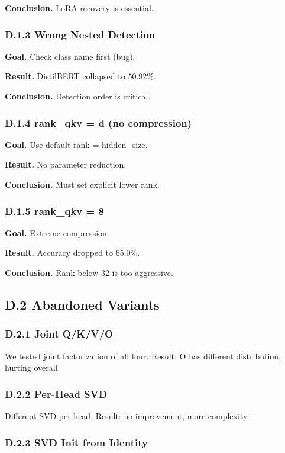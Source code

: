\textbf{Conclusion.} LoRA recovery is essential.

\subsubsection{D.1.3 Wrong Nested Detection}

\textbf{Goal.} Check class name first (bug).

\textbf{Result.} DistilBERT collapsed to 50.92\%.

\textbf{Conclusion.} Detection order is critical.

\subsubsection{D.1.4 rank\_qkv = d (no compression)}

\textbf{Goal.} Use default rank = hidden\_size.

\textbf{Result.} No parameter reduction.

\textbf{Conclusion.} Must set explicit lower rank.

\subsubsection{D.1.5 rank\_qkv = 8}

\textbf{Goal.} Extreme compression.

\textbf{Result.} Accuracy dropped to 65.0\%.

\textbf{Conclusion.} Rank below 32 is too aggressive.

\subsection{D.2 Abandoned Variants}

\subsubsection{D.2.1 Joint Q/K/V/O}

We tested joint factorization of all four. Result: O has different 
distribution, hurting overall.

\subsubsection{D.2.2 Per-Head SVD}

Different SVD per head. Result: no improvement, more complexity.

\subsubsection{D.2.3 SVD Init from Identity}


